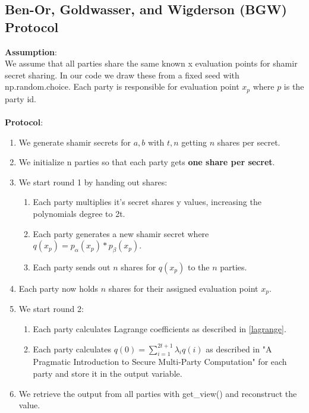 \documentclass{article}
\begin{document}
		\subsection{Ben-Or, Goldwasser, and Wigderson (BGW) Protocol}
            \textbf{Assumption}:\\
            We assume that all parties share the same known x evaluation points for shamir secret sharing. In our code we draw these from a fixed seed with np.random.choice. Each party is responsible for evaluation point $x_p$ where $p$ is the party id.\\\\
            \textbf{Protocol}:
            \begin{enumerate}
                \item We generate shamir secrets for $a, b$ with $t, n$ getting $n$ shares per secret.
                \item We initialize n parties so that each party gets \textbf{one share per secret}.
                \item We start round 1 by handing out shares:
                    \begin{enumerate}
                        \item Each party multiplies it's secret shares y values, increasing the polynomials degree to 2t.
                        \item Each party generates a new shamir secret where $q(x_p) = p_\alpha(x_p) * p_\beta(x_p)$.
                        \item Each party sends out $n$ shares for $q(x_p)$ to the $n$ parties.
                    \end{enumerate}
                \item Each party now holds $n$ shares for their assigned evaluation point $x_p$.
                \item We start round 2:
                    \begin{enumerate}
                        \item Each party calculates Lagrange coefficients as described in \ref{lagrange}.
                        \item Each party calculates $q(0) = \sum_{i=1}^{2t+1} \lambda_iq(i)$ as described in "A Pragmatic Introduction to Secure Multi-Party Computation" for each party and store it in the output variable.
                    \end{enumerate}
                \item We retrieve the output from all parties with get\_view() and reconstruct the value.
            \end{enumerate}
\end{document}
